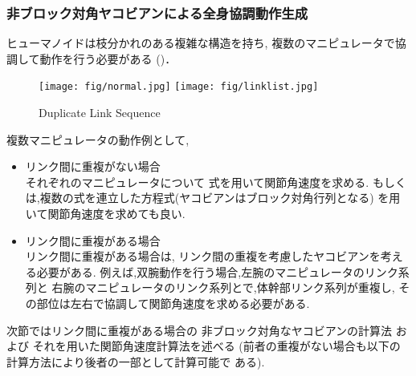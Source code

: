\subsubsection{非ブロック対角ヤコビアンによる全身協調動作生成}
ヒューマノイドは枝分かれのある複雑な構造を持ち,
複数のマニピュレータで協調して動作を行う必要がある
()．

\begin{figure}[htb]
  \begin{center}
    \texttt{[image: fig/normal.jpg]}
    \texttt{[image: fig/linklist.jpg]}
    \caption{Duplicate Link Sequence}
  \end{center}
\end{figure}

複数マニピュレータの動作例として,
\begin{itemize}
\item リンク間に重複がない場合\\
それぞれのマニピュレータについて
式を用いて関節角速度を求める.
もしくは,複数の式を連立した方程式(ヤコビアンはブロック対角行列となる)
を用いて関節角速度を求めても良い.
\item リンク間に重複がある場合\\
リンク間に重複がある場合は,
リンク間の重複を考慮したヤコビアンを考える必要がある.
例えば,双腕動作を行う場合,左腕のマニピュレータのリンク系列と
右腕のマニピュレータのリンク系列とで,体幹部リンク系列が重複し,
その部位は左右で協調して関節角速度を求める必要がある.
\end{itemize}
次節ではリンク間に重複がある場合の
非ブロック対角なヤコビアンの計算法
および
それを用いた関節角速度計算法を述べる
(前者の重複がない場合も以下の計算方法により後者の一部として計算可能で
ある).

